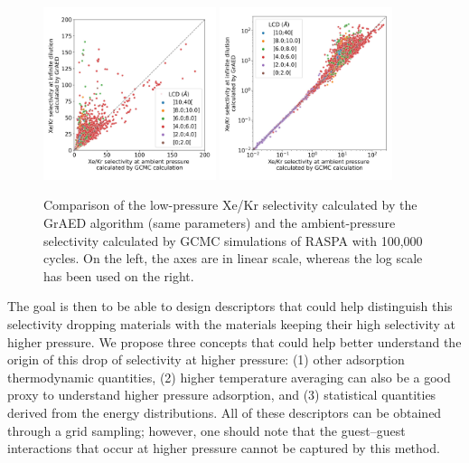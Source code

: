 \documentclass[main]{subfiles}
\begin{document}
\begin{figure}[ht]
  \centering
    \includegraphics[width=0.45\textwidth]{figures/3-fastsim/s_2080_vs_s_0_grid_overview.jpg}
    \includegraphics[width=0.45\textwidth]{figures/3-fastsim/s_2080_vs_s_0_grid_overview_log.jpg}
    \caption{Comparison of the low-pressure Xe/Kr selectivity calculated by the GrAED algorithm (same parameters) and the ambient-pressure selectivity calculated by GCMC simulations of RASPA with 100,000 cycles. On the left, the axes are in linear scale, whereas the log scale has been used on the right. }\label{fgr:grid_ambient_selectivity}
\end{figure}

The goal is then to be able to design descriptors that could help distinguish this selectivity dropping materials with the materials keeping their high selectivity at higher pressure. We propose three concepts that could help better understand the origin of this drop of selectivity at higher pressure: (1) other adsorption thermodynamic quantities, (2) higher temperature averaging can also be a good proxy to understand higher pressure adsorption, and (3) statistical quantities derived from the energy distributions. All of these descriptors can be obtained through a grid sampling; however, one should note that the guest--guest interactions that occur at higher pressure cannot be captured by this method.
\end{document}
